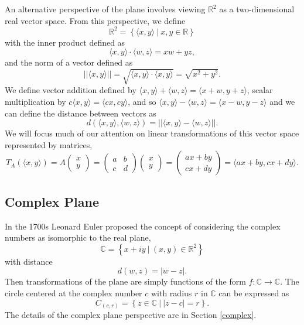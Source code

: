 \documentclass[
]{book}
\theoremstyle{definition}
\theoremstyle{definition}
\theoremstyle{definition}
\theoremstyle{definition}
\theoremstyle{remark}
\begin{document}
An alternative perspective of the plane involves viewing \(\mathbb{R}^2\) as a two-dimensional real vector space. From this perspective, we define
\[\mathbb{R}^2 = \left\{ \langle x,y\rangle  \: \vert \: x,y\in \mathbb{R}\right\}\] with the inner product defined as \[\langle x,y\rangle\cdot \langle w,z\rangle = xw+yz,\] and the norm of a vector defined as \[||\langle x,y\rangle ||=\sqrt{\langle x,y\rangle \cdot\langle x,y\rangle }=\sqrt{x^2+y^2}.\] We define vector addition defined by \(\langle x,y\rangle +\langle w,z\rangle = \langle x+w, y+z\rangle\), scalar multiplication by \(c \langle x,y\rangle =\langle cx,cy\rangle\), and so \(\langle x,y\rangle -\langle w,z\rangle = \langle x-w,y-z\rangle\) and we can define the distance between vectors as
\[d\left( \langle x,y\rangle ,\langle w,z\rangle \right) = || \langle x,y\rangle -\langle w,z\rangle ||.\] We will focus much of our attention on linear transformations of this vector space represented by matrices,
\[T_A\left(\langle x,y\rangle \right) = A\begin{pmatrix} x \\ y \end{pmatrix} = \begin{pmatrix} a & b \\ c & d \end{pmatrix} \begin{pmatrix} x \\ y \end{pmatrix} = \begin{pmatrix} ax+by \\ cx+dy \end{pmatrix} = \langle ax+by, cx+dy\rangle .\]

\hypertarget{complex-plane}{%
\subsection{Complex Plane}\label{complex-plane}}

In the 1700s Leonard Euler proposed the concept of considering the complex numbers as isomorphic to the real plane, \[\mathbb{C} = \left\{ x+iy \: \vert \: (x,y)\in \mathbb{R}^2\right\}\] with distance \[d(w,z) = |w-z|.\] Then transformations of the plane are simply functions of the form \(f:\mathbb{C} \rightarrow \mathbb{C}\). The circle centered at the complex number \(c\) with radius \(r\) in \(\mathbb{C}\) can be expressed as \[C_{(c,r)} = \left\{ z\in \mathbb{C} \: \vert \: |z-c|=r\right\}.\] The details of the complex plane perspective are in Section \ref{complex}.
\end{document}
